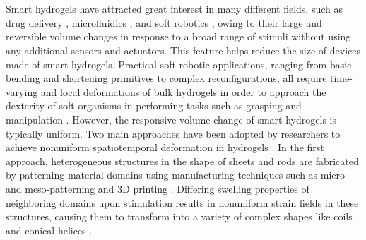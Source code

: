 \section{}
Smart hydrogels have attracted great interest in many different fields, such as drug delivery ,               
microfluidics , and soft robotics , owing to their large and reversible volume changes in response to a broad range of stimuli without using any additional sensors and actuators. This feature helps reduce the size of devices made of smart hydrogels. 
Practical soft robotic applications, ranging from basic bending and shortening primitives to complex reconfigurations, all require time-varying and local deformations of bulk hydrogels in order to approach the dexterity of 
soft organisms in performing tasks such as grasping and manipulation .
However, the responsive volume change of smart hydrogels is typically uniform.
Two main approaches have been adopted by researchers to achieve nonuniform spatiotemporal deformation in hydrogels . In the first approach, heterogeneous structures in the shape of sheets and rods are fabricated by patterning material domains using manufacturing techniques such as micro- and meso-patterning  and 3D printing . Differing swelling properties of neighboring domains upon stimulation results in nonuniform strain fields in these structures, causing them to transform into a variety of complex shapes like coils and conical helices .
